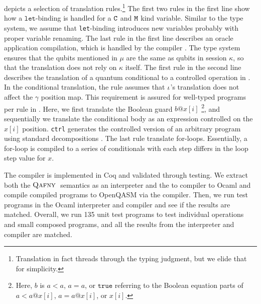  depicts a selection of translation rules.\footnote{Translation in fact threads through the typing judgment, but we elide that for simplicity.}
The first two rules in the first line show how a $\texttt{let}$-binding is handled for a $\texttt{C}$ and $\texttt{M}$ kind variable.
Similar to the type system, we assume that \texttt{let}-binding introduces new variables probably with proper variable renaming.
The last rule in the first line describes an oracle application compilation, which is handled by the \oqasm compiler \cite{oracleoopsla}. The \qafny type system ensures that the qubits mentioned in $\mu$ are the same as qubits in session $\kappa$, so that the translation does not rely on $\kappa$ itself.
The first rule in the second line describes the translation of a quantum conditional to a controlled operation in \sqir.
In the conditional translation, the rule assumes that $\iota$'s translation does not affect the $\gamma$ position map.
This requirement is assured for well-typed programs per rule  in .
Here, we first translate the Boolean guard $b@x[i]$ \footnote{Here, $b$ is $a < a$, $a=a$, or $\texttt{true}$ referring to the Boolean equation parts of $a < a @ x[i]$, $a=a @ x[i] $, or $x[i]$. }, and sequentially we translate the conditional body as an \sqir expression controlled on the $x[i]$ position. \texttt{ctrl} generates the controlled version of an arbitrary \sqir program using standard decompositions \cite[Chapter 4.3]{mike-and-ike}.
The last rule translate \qafny for-loops. Essentially, a for-loop is compiled to a series of conditionals with each step differs in the loop step value for $x$. 

The compiler is implemented in Coq and validated through testing. We extract both the $\textsc{Qafny}\;$ semantics as an interpreter and the \qafny to \sqir compiler to Ocaml and compile compiled \sqir programs to OpenQASM \cite{cross2021openqasm} via the \sqir compiler. Then, we run test programs in the \qafny Ocaml interpreter and compiler and see if the results are matched. Overall, we run 135 unit test programs to test individual operations and small composed programs, and all the results from the \qafny interpreter and compiler are matched.




